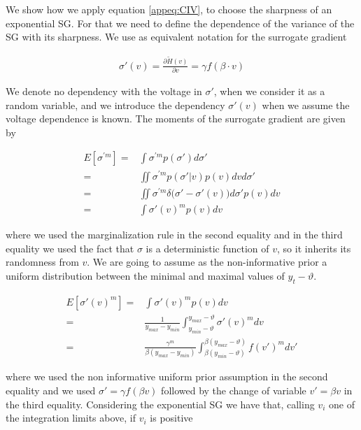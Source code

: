 We show how we apply equation \ref{appeq:CIV}, to choose the sharpness of an exponential SG. For that we need to define the dependence of the variance of the SG with its sharpness. We use as equivalent notation for the surrogate gradient

\begin{align*}
    \sigma'(v) = \frac{\partial\tilde{H}(v) }{\partial v} = \gamma f(\beta\cdot v)
\end{align*}

We denote no dependency with the voltage in $\sigma'$, when we consider it as a random variable, and we introduce the dependency  $\sigma'(v)$ when we assume the voltage dependence is known. 
The moments of the surrogate gradient are given by

\begin{align}
E[\sigma^{\prime m}]
    =&\int \sigma^{\prime m}p(\sigma') d\sigma'\\
    =&\iint \sigma^{\prime m}p(\sigma'|v)p(v)dv d\sigma' \\
    =&\iint \sigma^{\prime m}\delta\Big(\sigma'-\sigma'(v)\Big) d\sigma'p(v)dv \\
    =&\int \sigma'(v)^mp(v)dv
\end{align}

\noindent where we used the marginalization rule in the second equality and in the third equality we used the fact that $\sigma$ is a deterministic function of $v$, so it inherits its randomness from $v$. We are going to assume as the non-informative prior a uniform distribution between the minimal and maximal values of $y_t-\vartheta$.



\begin{align}
\label{eq:beta}
    E[\sigma'(v)^m]=&\int \sigma'(v)^mp(v)dv\\
    =&\frac{1}{y_{max}-y_{min}}\int^{y_{max}-\vartheta}_{y_{min}-\vartheta} \sigma'(v)^mdv\\
    =&\frac{\gamma^m}{\beta(y_{max}-y_{min})}\int^{\beta(y_{max}-\vartheta)}_{\beta(y_{min}-\vartheta)} f(v')^mdv' 
\end{align}

\noindent where we used the non informative uniform prior assumption in the second equality and we used $\sigma'=\gamma f(\beta v)$ followed by the change of variable $v'=\beta v$ in the third equality. Considering the exponential SG we have that, calling $v_i$ one of the integration limits above, if $v_i$ is positive



